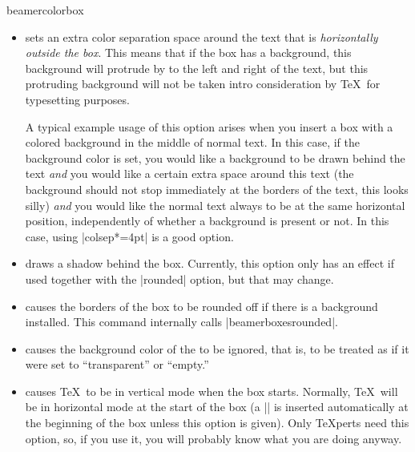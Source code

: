 \begin{environment}{{beamercolorbox}}
\begin{itemize}
  \item
     sets an extra color separation space around the text that is \emph{horizontally outside the box}. This means that if the box has a background, this background will protrude by  to the left and right of the text, but this protruding background will not be taken intro consideration by \TeX\ for typesetting purposes.

    A typical example usage of this option arises when you insert a box with a colored background in the middle of normal text. In this case, if the background color is set, you would like a background to be drawn behind the text \emph{and} you would like a certain extra space around this text (the background should not stop immediately at the borders of the text, this looks silly) \emph{and} you would like the normal text always to be at the same horizontal position, independently of whether a background is present or not. In this case, using |colsep*=4pt| is a good option.
  \item
     draws a shadow behind the box. Currently, this option only has an effect if used together with the |rounded| option, but that may change.
  \item
     causes the borders of the box to be rounded off if there is a background installed. This command internally calls |beamerboxesrounded|.
  \item
     causes the background color of the  to be ignored, that is, to be treated as if it were set to ``transparent'' or ``empty.''
  \item
     causes \TeX\ to be in vertical mode when the box starts. Normally, \TeX\ will be in horizontal mode at the start of the box (a |\leavevmode| is inserted automatically at the beginning of the box unless this option is given). Only \TeX perts need this option, so, if you use it, you will probably know what you are doing anyway.
  \end{itemize}
\end{environment}

